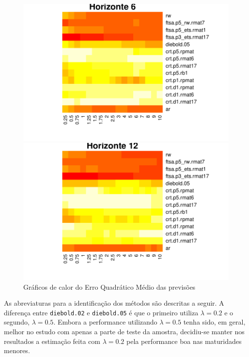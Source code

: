 \documentclass[
	12pt,				%
	openright,			%
	oneside,			%
	a4paper,			%
	english,			%
	brazil				%
	]{dissertacao-ufrgs-abntex2}
\begin{document}
\begin{figure}[htp]
\begin{minipage}[t]{0.45\linewidth}
\begin{minipage}[t]{\linewidth}
      \centering     \includegraphics[width=\textwidth]{anexos/heatmap6.pdf}
    \end{minipage}
    \begin{minipage}[b]{\linewidth}
      \centering     \includegraphics[width=\textwidth]{anexos/heatmap12.pdf} 
    \end{minipage}
  \end{minipage}
  \caption{Gráficos de calor do Erro Quadrático Médio das previsões}
  \label{fig:heatmaps}
\end{figure}


As abreviaturas para a identificação dos métodos são descritas a seguir. A diferença entre \texttt{diebold.02} e \texttt{diebold.05} é que o primeiro utiliza $\lambda=0.2$ e o segundo, $\lambda=0.5$. Embora a performance utilizando $\lambda=0.5$ tenha sido, em geral, melhor no estudo com apenas a parte de teste da amostra, decidiu-se manter nos resultados a estimação feita com $\lambda=0.2$ pela performance boa nas maturidades menores.
\end{document}
